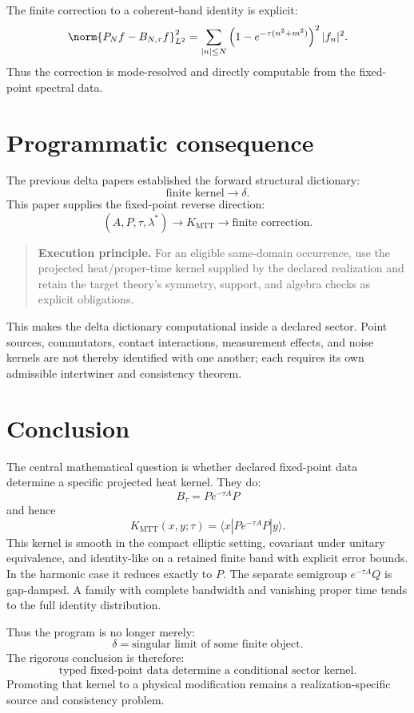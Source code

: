 \documentclass[11pt]{article}
\begin{document}
The finite correction to a coherent-band identity is explicit:
\[
        \norm{P_Nf-B_{N,\tau}f}_{L^2}^2
        =
        \sum_{|n|\le N}
        \left(1-e^{-\tau(n^2+m^2)}\right)^2|f_n|^2.
\]
Thus the correction is mode-resolved and directly computable from the fixed-point spectral
data.

\section{Programmatic consequence}

The previous delta papers established the forward structural dictionary:
\[
        \text{finite kernel}\longrightarrow \delta.
\]
This paper supplies the fixed-point reverse direction:
\[
        (A,P,\tau,\lambda^\ast)
        \longrightarrow
        K_{\mathrm{MTT}}
        \longrightarrow
        \text{finite correction}.
\]

\begin{quote}
\textbf{Execution principle.}
For an eligible same-domain occurrence, use the projected heat/proper-time
kernel supplied by the declared realization and retain the target theory's
symmetry, support, and algebra checks as explicit obligations.
\end{quote}

This makes the delta dictionary computational inside a declared sector.
Point sources, commutators, contact interactions, measurement effects, and
noise kernels are not thereby identified with one another; each requires its
own admissible intertwiner and consistency theorem.

\section{Conclusion}

The central mathematical question is whether declared fixed-point data
determine a specific projected heat kernel.  They do:
\[
        B_\tau=P e^{-\tau A}P
\]
and hence
\[
        K_{\mathrm{MTT}}(x,y;\tau)
        =
        \langle x|Pe^{-\tau A}P|y\rangle.
\]
This kernel is smooth in the compact elliptic setting, covariant under
unitary equivalence, and identity-like on a retained finite band with
explicit error bounds.  In the harmonic case it reduces exactly to \(P\).
The separate semigroup \(e^{-\tau A}Q\) is gap-damped.  A family with
complete bandwidth and vanishing proper time tends to the full identity
distribution.

Thus the program is no longer merely:
\[
        \delta=\text{singular limit of some finite object}.
\]
The rigorous conclusion is therefore:
\[
        \boxed{
        \text{typed fixed-point data determine a conditional sector kernel.}
        }
\]
Promoting that kernel to a physical modification remains a
realization-specific source and consistency problem.
\end{document}
